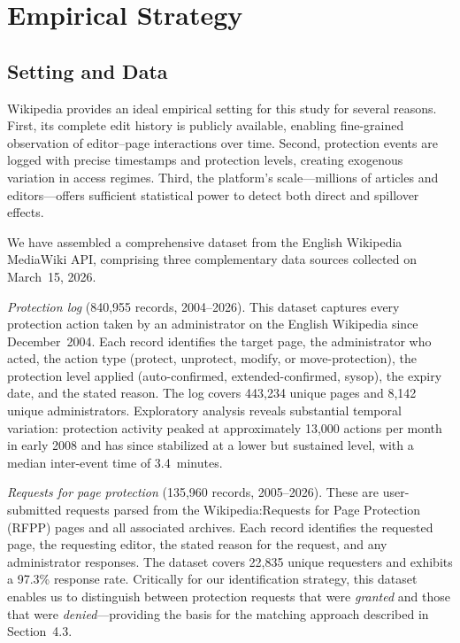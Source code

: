 \documentclass[11pt]{article}
\begin{document}
\section{Empirical Strategy}

\subsection{Setting and Data}

Wikipedia provides an ideal empirical setting for this study for several reasons. First, its complete edit history is publicly available, enabling fine-grained observation of editor--page interactions over time. Second, protection events are logged with precise timestamps and protection levels, creating exogenous variation in access regimes. Third, the platform's scale---millions of articles and editors---offers sufficient statistical power to detect both direct and spillover effects.

We have assembled a comprehensive dataset from the English Wikipedia MediaWiki API, comprising three complementary data sources collected on March~15, 2026.

\emph{Protection log} (840,955 records, 2004--2026). This dataset captures every protection action taken by an administrator on the English Wikipedia since December~2004. Each record identifies the target page, the administrator who acted, the action type (protect, unprotect, modify, or move-protection), the protection level applied (auto-confirmed, extended-confirmed, sysop), the expiry date, and the stated reason. The log covers 443,234 unique pages and 8,142 unique administrators. Exploratory analysis reveals substantial temporal variation: protection activity peaked at approximately 13,000 actions per month in early 2008 and has since stabilized at a lower but sustained level, with a median inter-event time of 3.4~minutes.

\emph{Requests for page protection} (135,960 records, 2005--2026). These are user-submitted requests parsed from the Wikipedia:Requests for Page Protection (RFPP) pages and all associated archives. Each record identifies the requested page, the requesting editor, the stated reason for the request, and any administrator responses. The dataset covers 22,835 unique requesters and exhibits a 97.3\% response rate. Critically for our identification strategy, this dataset enables us to distinguish between protection requests that were \emph{granted} and those that were \emph{denied}---providing the basis for the matching approach described in Section~4.3.
\end{document}
